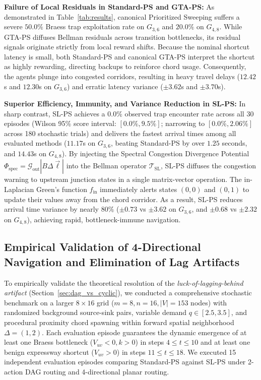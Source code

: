 \documentclass[11pt,a4paper]{article}
\begin{document}
\textbf{Failure of Local Residuals in Standard-PS and GTA-PS:}
As demonstrated in Table~\ref{tab:results}, canonical Prioritized Sweeping suffers a severe $50.0\%$ Braess trap exploitation rate on $G_{3,6}$ and $20.0\%$ on $G_{4,8}$. While GTA-PS diffuses Bellman residuals across transition bottlenecks, its residual signals originate strictly from local reward shifts. Because the nominal shortcut latency is small, both Standard-PS and canonical GTA-PS interpret the shortcut as highly rewarding, directing backups to reinforce chord usage. Consequently, the agents plunge into congested corridors, resulting in heavy travel delays ($12.42$s and $12.30$s on $G_{3,6}$) and erratic latency variance ($\pm 3.62$s and $\pm 3.70$s).

\textbf{Superior Efficiency, Immunity, and Variance Reduction in SL-PS:}
In sharp contrast, SL-PS achieves a $0.0\%$ observed trap encounter rate across all 30 episodes (Wilson 95\% score interval: $[0.0\%, 9.5\%]$; narrowing to $[0.0\%, 2.06\%]$ across 180 stochastic trials) and delivers the fastest arrival times among all evaluated methods ($11.17$s on $G_{3,6}$, beating Standard-PS by over $1.25$ seconds, and $14.43$s on $G_{4,8}$). By injecting the Spectral Congestion Divergence Potential $\Phi_{\text{spec}} = \mathcal{G}_{\text{out}} |B \Delta \vec{\ell}|$ into the Bellman operator $\mathcal{T}_{\text{SL}}$, SL-PS diffuses the congestion warning to upstream junction states in a single matrix-vector operation. The in-Laplacian Green's function $f_{\text{in}}$ immediately alerts states $(0, 0)$ and $(0, 1)$ to update their values away from the chord corridor. As a result, SL-PS reduces arrival time variance by nearly $80\%$ ($\pm 0.73$ vs $\pm 3.62$ on $G_{3,6}$, and $\pm 0.68$ vs $\pm 2.32$ on $G_{4,8}$), achieving rapid, bottleneck-immune navigation.

\subsection{Empirical Validation of 4-Directional Navigation and Elimination of Lag Artifacts}
\label{sec:exp_4directional}

To empirically validate the theoretical resolution of the \textit{luck-of-lagging-behind artifact} (Section~\ref{sec:dag_vs_cyclic}), we conducted a comprehensive stochastic benchmark on a larger $8 \times 16$ grid ($m=8, n=16, |V|=153$ nodes) with randomized background source-sink pairs, variable demand $q \in [2.5, 3.5]$, and procedural proximity chord spawning within forward spatial neighborhood $\Delta = (1, 2)$. Each evaluation episode guarantees the dynamic emergence of at least one Braess bottleneck ($V_{uv} < 0, k > 0$) in steps $4 \le t \le 10$ and at least one benign expressway shortcut ($V_{uv} > 0$) in steps $11 \le t \le 18$. We executed 15 independent evaluation episodes comparing Standard-PS against SL-PS under 2-action DAG routing and 4-directional planar routing.
\end{document}

